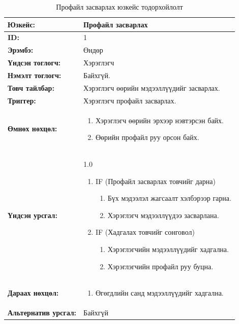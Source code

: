 \begin{table}[H]
    \caption{Профайл засварлах юзкейс тодорхойлолт}
    \begin{tabular}{|l|p{9cm}|}
		\hline
		{\bfseries Юзкейс:} & Профайл засварлах \\\hline
		{\bfseries ID:} & 1 \\\hline
		{\bfseries Эрэмбэ:} & Өндөр \\\hline
		{\bfseries Үндсэн тоглогч:} & Хэрэглэгч \\\hline
		{\bfseries Нэмэлт тоглогч:} & Байхгүй. \\\hline
		{\bfseries Товч тайлбар:} & Хэрэглэгч өөрийн мэдээллүүдийг засварлах. \\\hline
		{\bfseries Триггер:} & Хэрэглэгч профайл засварлах. \\\hline
		{\bfseries Өмнөх нөхцөл:} & 
		    \begin{enumerate}[nosep]
		        \item Хэрэглэгч өөрийн эрхээр нэвтэрсэн байх.
		        \item Өөрийн профайл руу орсон байх.
		    \end{enumerate}
		\\\hline
		{\bfseries Үндсэн урсгал:} &
			1.0
			\begin{enumerate}[nosep]
				\item IF (Профайл засварлах товчийг дарна)
				    \begin{enumerate}[nosep]
				        \item Бүх мэдээлэл жагсаалт хэлбэрээр гарна.
                        \item Хэрэглэгч мэдээллүүдээ засварлана.
				    \end{enumerate}
				\item IF (Хадгалах товчийг сонговол)
				    \begin{enumerate}[nosep]
				        \item Хэрэглэгчийн мэдээллүүдийг хадгална.
				        \item Хэрэглэгчийн профайл руу буцна.
				    \end{enumerate}
			\end{enumerate}
		\\\hline
		{\bfseries Дараах нөхцөл:} &
		    \begin{enumerate}[nosep]
		        \item Өгөгдлийн санд мэдээллүүдийг хадгална.
		    \end{enumerate}
		\\\hline
		{\bfseries Альтернатив урсгал:} & Байхгүй \\
		\hline
    \end{tabular}
\end{table}

